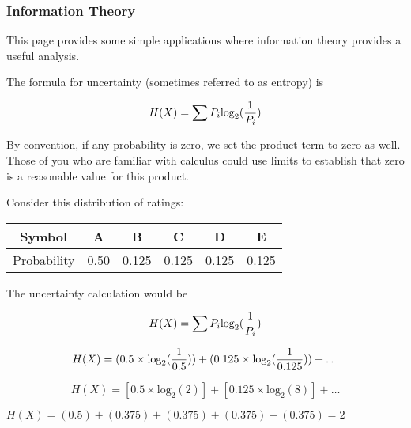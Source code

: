 \begin{frame}
\frametitle{Information Theory}


This page provides some simple applications where information theory provides a useful analysis.


The formula for uncertainty (sometimes referred to as entropy) is


\[ H(X)  = \sum P_i \mbox{log}_2({1 \over P_i}) \]


By convention, if any probability is zero, we set the product term to zero as well. Those of you who are familiar with calculus 
could use limits to establish that zero is a reasonable value for this product.
\end{frame}






\begin{frame}
Consider this distribution of ratings:
\begin{center}
\begin{tabular}{c|ccccc|}
Symbol & A & B & C & D & E \\ \hline
Probability & 0.50 & 0.125 & 0.125 & 0.125 & 0.125 \\ \hline
\end{tabular}
\end{center}
\end{frame}




\begin{frame}
The uncertainty calculation would be


\[ H(X)  = \sum P_i \mbox{log}_2({1 \over P_i}) \]






\[ H(X)  = (0.5 \times \mbox{log}_2({1 \over 0.5}) ) + (0.125 \times \mbox{log}_2({1 \over 0.125}) )  + \ldots\]


\[ H(X)  = [0.5 \times \mbox{log}_2(2) ] + [0.125 \times \mbox{log}_2(8) ]  + \ldots\]


$H(X) = (0.5) + (0.375) + (0.375) + (0.375) + (0.375) = 2 $
\end{frame}


